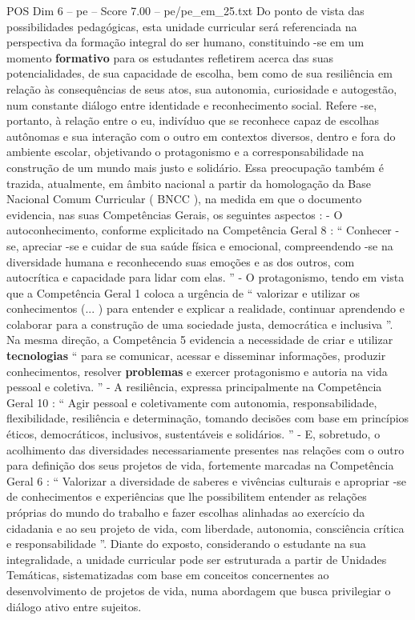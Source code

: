 \begin{textsample}{POS Dim 6 – pe – Score 7.00 – pe/pe\_em\_25.txt}
Do ponto de vista das possibilidades pedagógicas, esta unidade curricular será referenciada na perspectiva da formação integral do ser humano, constituindo -se em um momento \textbf{formativo} para os estudantes refletirem acerca das suas potencialidades, de sua capacidade de escolha, bem como de sua resiliência em relação às consequências de seus atos, sua autonomia, curiosidade e autogestão, num constante diálogo entre identidade e reconhecimento social.
Refere -se, portanto, à relação entre o eu, indivíduo que se reconhece capaz de escolhas autônomas e sua interação com o outro em contextos diversos, dentro e fora do ambiente escolar, objetivando o protagonismo e a corresponsabilidade na construção de um mundo mais justo e solidário.
Essa preocupação também é trazida, atualmente, em âmbito nacional a partir da homologação da Base Nacional Comum Curricular ( BNCC ), na medida em que o documento evidencia, nas suas Competências Gerais, os seguintes aspectos : - O autoconhecimento, conforme explicitado na Competência Geral 8 : “ Conhecer -se, apreciar -se e cuidar de sua saúde física e emocional, compreendendo -se na diversidade humana e reconhecendo suas emoções e as dos outros, com autocrítica e capacidade para lidar com elas. ” - O protagonismo, tendo em vista que a Competência Geral 1 coloca a urgência de “ valorizar e utilizar os conhecimentos (... ) para entender e explicar a realidade, continuar aprendendo e colaborar para a construção de uma sociedade justa, democrática e inclusiva ”.
Na mesma direção, a Competência 5 evidencia a necessidade de criar e utilizar \textbf{tecnologias} “ para se comunicar, acessar e disseminar informações, produzir conhecimentos, resolver \textbf{problemas} e exercer protagonismo e autoria na vida pessoal e coletiva. ” - A resiliência, expressa principalmente na Competência Geral 10 : “ Agir pessoal e coletivamente com autonomia, responsabilidade, flexibilidade, resiliência e determinação, tomando decisões com base em princípios éticos, democráticos, inclusivos, sustentáveis e solidários. ” - E, sobretudo, o acolhimento das diversidades necessariamente presentes nas relações com o outro para definição dos seus projetos de vida, fortemente marcadas na Competência Geral 6 : “ Valorizar a diversidade de saberes e vivências culturais e apropriar -se de conhecimentos e experiências que lhe possibilitem entender as relações próprias do mundo do trabalho e fazer escolhas alinhadas ao exercício da cidadania e ao seu projeto de vida, com liberdade, autonomia, consciência crítica e responsabilidade ”.
Diante do exposto, considerando o estudante na sua integralidade, a unidade curricular pode ser estruturada a partir de Unidades Temáticas, sistematizadas com base em conceitos concernentes ao desenvolvimento de projetos de vida, numa abordagem que busca privilegiar o diálogo ativo entre sujeitos.

\end{textsample}
